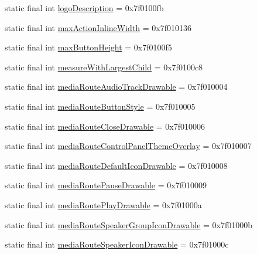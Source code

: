 \begin{CompactItemize}
static final int \hyperlink{classandroid_1_1support_1_1transition_1_1_r_1_1attr_6bb7fc1f23f16580c4ce7df401417ab8}{logoDescription} = 0x7f0100fb
\item 
static final int \hyperlink{classandroid_1_1support_1_1transition_1_1_r_1_1attr_09510d342ddc2fbd5d4106bf48843c45}{maxActionInlineWidth} = 0x7f010136
\item 
static final int \hyperlink{classandroid_1_1support_1_1transition_1_1_r_1_1attr_327bf8f12b9bf74d7e5f1be34cfb9e74}{maxButtonHeight} = 0x7f0100f5
\item 
static final int \hyperlink{classandroid_1_1support_1_1transition_1_1_r_1_1attr_5dc30089edc2c14f092ed9dc3419ec30}{measureWithLargestChild} = 0x7f0100c8
\item 
static final int \hyperlink{classandroid_1_1support_1_1transition_1_1_r_1_1attr_e64ba5b0430421a6169f4a32e72875c6}{mediaRouteAudioTrackDrawable} = 0x7f010004
\item 
static final int \hyperlink{classandroid_1_1support_1_1transition_1_1_r_1_1attr_ee6f9b1e2fd23eb486c56561171555cd}{mediaRouteButtonStyle} = 0x7f010005
\item 
static final int \hyperlink{classandroid_1_1support_1_1transition_1_1_r_1_1attr_a811a59fa217dfa813c980a894644f88}{mediaRouteCloseDrawable} = 0x7f010006
\item 
static final int \hyperlink{classandroid_1_1support_1_1transition_1_1_r_1_1attr_a0548efe8d46ac25b70ee60e55cb8f05}{mediaRouteControlPanelThemeOverlay} = 0x7f010007
\item 
static final int \hyperlink{classandroid_1_1support_1_1transition_1_1_r_1_1attr_bb55aee2e63a9a13cdca814a119fa901}{mediaRouteDefaultIconDrawable} = 0x7f010008
\item 
static final int \hyperlink{classandroid_1_1support_1_1transition_1_1_r_1_1attr_9026d1a6b19ce0743f229f551a44965b}{mediaRoutePauseDrawable} = 0x7f010009
\item 
static final int \hyperlink{classandroid_1_1support_1_1transition_1_1_r_1_1attr_e4801ae0b533fef488419da1fea8efac}{mediaRoutePlayDrawable} = 0x7f01000a
\item 
static final int \hyperlink{classandroid_1_1support_1_1transition_1_1_r_1_1attr_33d34188372a574401fabbe5194b0c0b}{mediaRouteSpeakerGroupIconDrawable} = 0x7f01000b
\item 
static final int \hyperlink{classandroid_1_1support_1_1transition_1_1_r_1_1attr_55af0f56de433facb4598f7cd4d5e832}{mediaRouteSpeakerIconDrawable} = 0x7f01000c
\item 

\end{CompactItemize}
